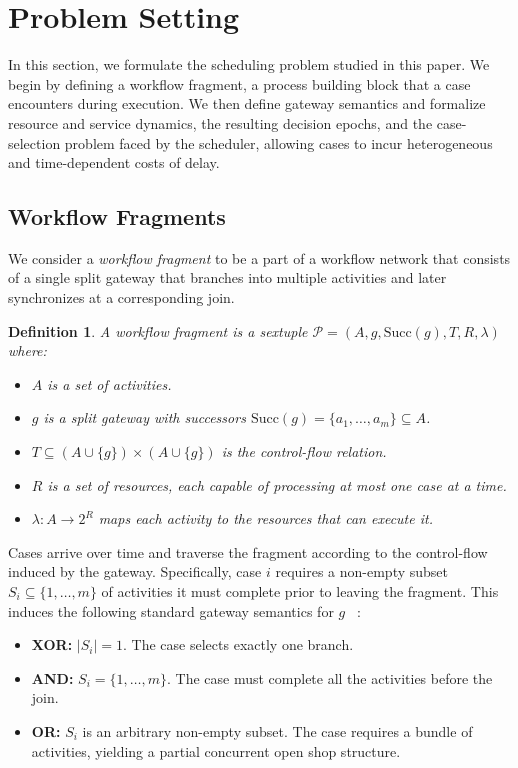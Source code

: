 \documentclass[letterpaper]{article}
\newtheorem{definition}{Definition}
\begin{document}
\section{Problem Setting}
\label{sec:env}


In this section, we formulate the scheduling problem studied in this paper. 
We begin by defining a workflow fragment, a process building block that a case encounters during execution. 
We then define gateway semantics and formalize resource and service dynamics, the resulting decision epochs, and the case-selection problem faced by the scheduler, allowing cases to incur heterogeneous and time-dependent costs of delay.

\subsection{Workflow Fragments}

We consider a {\em workflow fragment}
to be a part of a workflow network that consists of a single split gateway 
that branches into multiple activities and later
synchronizes at a corresponding join.
\begin{definition}\label{def:processFragment}
A {\em workflow fragment} is a sextuple $\mathcal{P} = (A, g, \mathrm{Succ}(g), T, R, \lambda)$
where:
\begin{itemize}
  \item $A$ is a set of activities.
  \item $g$ is a split gateway with successors
        $\mathrm{Succ}(g)=\{a_1,\dots,a_m\}\subseteq A$.
  \item $T \subseteq (A \cup \{g\}) \times (A \cup \{g\})$ is the
        control-flow relation.
  \item $R$ is a set of resources, each capable of processing at
        most one case at a time.
  \item $\lambda : A \to 2^R$ maps each activity to the resources that
        can execute it. 
\end{itemize}
\end{definition} \noindent Cases arrive over time and
traverse the fragment according to the control-flow induced by the
gateway. Specifically, case $i$ requires a non-empty subset
$S_i \subseteq \{1,\dots,m\}$ of activities it must complete prior to leaving
the fragment. This induces the following standard gateway
semantics for $g$ ~\citep{dumas2018fundamentals}:
\begin{itemize}
  \item \textbf{XOR:} $|S_i|=1$.  The case selects exactly one branch.
  \item \textbf{AND:} $S_i = \{1,\dots,m\}$.  The case must complete all the activities before the join.
  \item \textbf{OR:} $S_i$ is an arbitrary non-empty subset.  The case
        requires a bundle of activities, yielding a partial concurrent
        open shop structure.
\end{itemize}
\end{document}
